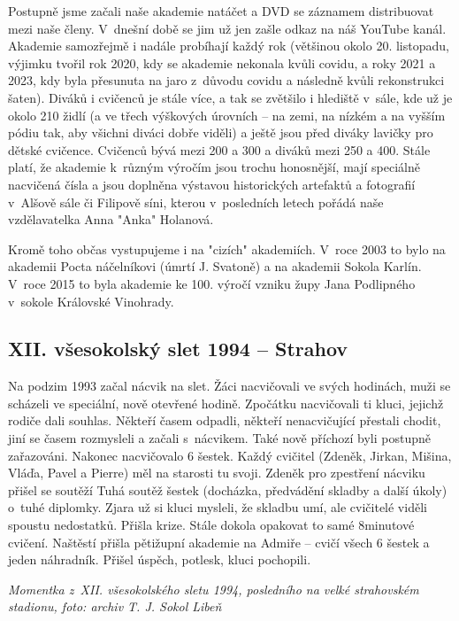 \documentclass[a5paper, 12pt, twoside]{article}
\begin{document}
Postupně jsme začali naše akademie natáčet a DVD se záznamem
distribuovat mezi naše členy. V~dnešní době se jim už jen zašle odkaz na
náš YouTube kanál. Akademie samozřejmě i nadále probíhají každý rok
(většinou okolo 20. listopadu, výjimku tvořil rok 2020, kdy se akademie
nekonala kvůli covidu, a roky 2021 a 2023, kdy byla přesunuta na jaro
z~důvodu covidu a následně kvůli rekonstrukci šaten). Diváků i cvičenců je
stále více, a tak se zvětšilo i hlediště v~sále, kde už je okolo 210
židlí (a ve třech výškových úrovních -- na zemi, na nízkém a na vyšším
pódiu tak, aby všichni diváci dobře viděli) a ještě jsou před diváky
lavičky pro dětské cvičence. Cvičenců bývá mezi 200 a 300 a diváků mezi
250 a 400. Stále platí, že akademie k~různým výročím jsou trochu
honosnější, mají speciálně nacvičená čísla a jsou doplněna výstavou
historických artefaktů a fotografií v~Alšově sále či Filipově síni,
kterou v~posledních letech pořádá naše vzdělavatelka Anna "Anka"
Holanová.

Kromě toho občas vystupujeme i na "cizích" akademiích. V~roce 2003 to
bylo na akademii Pocta náčelníkovi (úmrtí J. Svatoně) a na akademii
Sokola Karlín. V~roce 2015 to byla akademie ke 100. výročí vzniku župy
Jana Podlipného v~sokole Královské Vinohrady.

\subsection{XII. všesokolský slet 1994 --
Strahov}

Na podzim 1993 začal nácvik na slet. Žáci nacvičovali ve svých hodinách,
muži se scházeli ve speciální, nově otevřené hodině. Zpočátku
nacvičovali ti kluci, jejichž rodiče dali souhlas. Někteří časem
odpadli, někteří nenacvičující přestali chodit, jiní se časem rozmysleli
a začali s~nácvikem. Také nově příchozí byli postupně zařazováni.
Nakonec nacvičovalo 6 šestek. Každý cvičitel (Zdeněk, Jirkan, Mišina,
Vláďa, Pavel a Pierre) měl na starosti tu svoji. Zdeněk pro zpestření
nácviku přišel se soutěží Tuhá soutěž šestek (docházka, předvádění
skladby a další úkoly) o~tuhé diplomky. Zjara už si kluci mysleli, že
skladbu umí, ale cvičitelé viděli spoustu nedostatků. Přišla krize.
Stále dokola opakovat to samé 8minutové cvičení. Naštěstí přišla
pětižupní akademie na Admiře -- cvičí všech 6 šestek a jeden náhradník.
Přišel úspěch, potlesk, kluci pochopili.


\textit{Momentka z~XII. všesokolského sletu 1994, posledního na velké
strahovském stadionu, foto: archiv T. J. Sokol Libeň}
\end{document}

